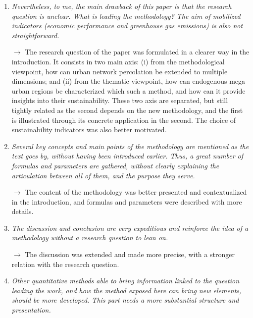 \documentclass[11pt,a4paper,sans]{moderncv}        %
\begin{document}
\begin{enumerate}
\item \textit{Nevertheless, to me, the main drawback of this paper is that the research question is unclear. What is leading the methodology? The aim of mobilized indicators (economic performance and greenhouse gas emissions) is also not straightforward.}

$\rightarrow$ The research question of the paper was formulated in a clearer way in the introduction. It consists in two main axis: (i) from the methodological viewpoint, how can urban network percolation be extended to multiple dimensions; and (ii) from the thematic viewpoint, how can endogenous mega urban regions be characterized which such a method, and how can it provide insights into their sustainability. These two axis are separated, but still tightly related as the second depends on the new methodology, and the first is illustrated through its concrete application in the second. The choice of sustainability indicators was also better motivated.

\medskip

\item \textit{Several key concepts and main points of the methodology are mentioned as the text goes by, without having been introduced earlier. Thus, a great number of formulas and parameters are gathered, without clearly explaining the articulation between all of them, and the purpose they serve.}

$\rightarrow$ The content of the methodology was better presented and contextualized in the introduction, and formulas and parameters were described with more details.

\medskip

\item \textit{The discussion and conclusion are very expeditious and reinforce the idea of a methodology without a research question to lean on.}

$\rightarrow$ The discussion was extended and made more precise, with a stronger relation with the research question.

\medskip


\item \textit{Other quantitative methods able to bring information linked to the question leading the work, and how the method exposed here can bring new elements, should be more developed. This part needs a more substantial structure and presentation.}


\end{enumerate}
\end{document}
